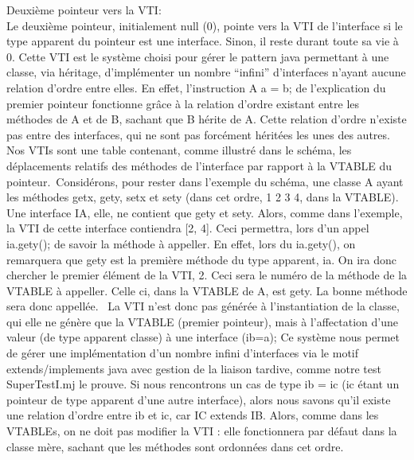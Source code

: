 Deuxième pointeur vers la VTI:\\
Le deuxième pointeur, initialement null (0), pointe vers la VTI de l'interface
si le type apparent du pointeur est une interface. Sinon, il reste durant toute sa vie à 0.
Cette VTI est le système choisi pour gérer le pattern java permettant à une classe, via héritage,
d'implémenter un nombre ``infini'' d'interfaces n'ayant aucune relation d'ordre
entre elles. En effet, l'instruction A a = b; de l'explication du premier
pointeur fonctionne grâce à la relation d'ordre existant entre les méthodes de A
et de B, sachant que B hérite de A. Cette relation d'ordre n'existe pas entre
des interfaces, qui ne sont pas forcément héritées les unes des autres.
Nos VTIs sont une table contenant, comme illustré dans le schéma, les déplacements
relatifs des méthodes de l'interface par rapport à la VTABLE du pointeur.\
Considérons, pour rester dans l'exemple du schéma, une classe A ayant les
méthodes getx, gety, setx et sety (dans cet ordre, 1 2 3 4, dans la VTABLE). Une
interface IA, elle, ne contient que gety et sety. Alors, comme dans l'exemple,
la VTI de cette interface contiendra [2, 4]. Ceci permettra, lors d'un appel
ia.gety(); de savoir la méthode à appeller. En effet, lors du ia.gety(), on
remarquera que gety est la première méthode du type apparent, ia. On ira donc
chercher le premier élément de la VTI, 2. Ceci sera le numéro de la méthode de
la VTABLE à appeller. Celle ci, dans la VTABLE de A, est gety. La bonne méthode
sera donc appellée. \
La VTI n'est donc pas générée à l'instantiation de la classe, qui elle ne génère
que la VTABLE (premier pointeur), mais à l'affectation d'une valeur (de type
apparent classe) à une interface (ib=a); Ce système nous permet de gérer une
implémentation d'un nombre infini d'interfaces via le motif extends/implements
java avec gestion de la liaison tardive, comme notre test SuperTestI.mj le
prouve. Si nous rencontrons un cas de type ib = ic (ic étant un pointeur de type apparent
d'une autre interface), alors nous savons qu'il existe une relation d'ordre entre ib et ic, 
car IC extends IB. Alors, comme dans les VTABLEs, on ne doit pas modifier la VTI : elle fonctionnera 
par défaut dans la classe mère, sachant que les méthodes sont ordonnées dans cet ordre.


